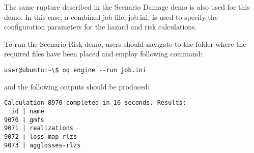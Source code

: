 The same rupture described in the Scenario Damage demo is also used for this
demo. In this case, a combined job file, job.ini, is used to specify the
configuration parameters for the hazard and risk calculations.

To run the Scenario Risk demo, users should navigate to the folder where the
required files have been placed and employ following command:

\begin{verbatim}
user@ubuntu:~\$ oq engine --run job.ini
\end{verbatim}

and the following outputs should be produced:

\begin{verbatim}
Calculation 8970 completed in 16 seconds. Results:
  id | name
9070 | gmfs
9071 | realizations
9072 | loss_map-rlzs
9073 | agglosses-rlzs
\end{verbatim}
